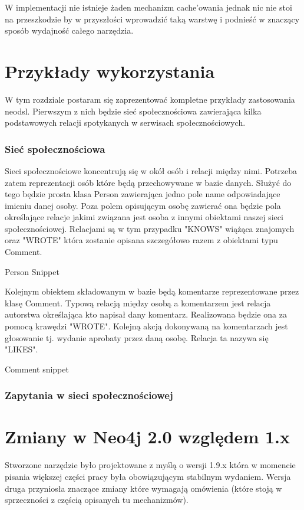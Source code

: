 \documentclass[brudnopis]{xmgr}
\begin{document}
W implementacji nie istnieje żaden mechanizm cache'owania jednak nic nie stoi na przeszkodzie by w przyszłości wprowadzić taką warstwę i podnieść w znaczący sposób wydajność całego narzędzia.

\chapter{Przykłady wykorzystania}

W tym rozdziale postaram się zaprezentować kompletne przykłady zastosowania neodsl. Pierwszym z nich będzie sieć społecznościowa zawierająca kilka podstawowych relacji spotykanych w serwisach społecznościowych.

\subsection{Sieć społecznościowa}

Sieci społecznościowe koncentrują się w okół osób i relacji między nimi. Potrzeba zatem reprezentacji osób które będą przechowywane w bazie danych. Służyć do tego będzie prosta klasa Person zawierająca jedno pole name odpowiadające imieniu danej osoby. Poza polem opisującym osobę zawierać ona będzie pola określające relacje jakimi związana jest osoba z innymi obiektami naszej sieci społecznościowej. Relacjami są w tym przypadku "KNOWS" wiążąca znajomych oraz "WROTE" która zostanie opisana szczegółowo razem z obiektami typu Comment.

Person Snippet

Kolejnym obiektem składowanym w bazie będą komentarze reprezentowane przez klasę Comment. Typową relacją między osobą a komentarzem jest relacja autorstwa określająca kto napisał dany komentarz. Realizowana będzie ona za pomocą krawędzi "WROTE". Kolejną akcją dokonywaną na komentarzach jest głosowanie tj. wydanie aprobaty przez daną osobę. Relacja ta nazywa się "LIKES".

Comment snippet

\subsection{Zapytania w sieci społecznościowej}

\chapter{Zmiany w Neo4j 2.0 względem 1.x}

Stworzone narzędzie było projektowane z myślą o wersji 1.9.x która w momencie pisania większej części pracy była obowiązującym stabilnym wydaniem. Wersja druga przyniosła znaczące zmiany które wymagają omówienia (które stoją w sprzeczności z częścią opisanych tu mechanizmów).
\end{document}
